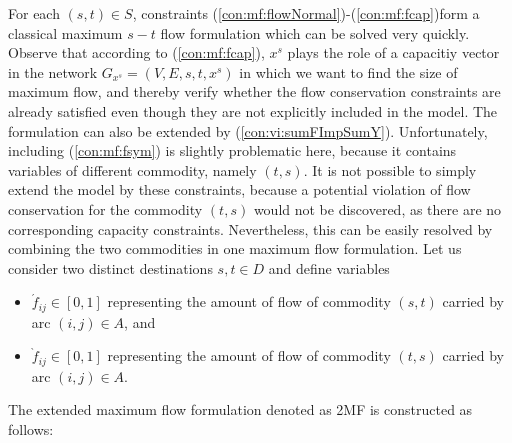 For each $(s,t)\in S$, constraints (\ref{con:mf:flowNormal})-(\ref{con:mf:fcap})form a classical maximum $s-t$ flow formulation which can be solved very quickly. Observe that according to (\ref{con:mf:fcap}), $x^s$ plays the role of a capacitiy vector in the network $G_{x^s}=(V,E,s,t,x^s)$ in which we want to find the size of maximum flow, and thereby verify whether the flow conservation constraints are already satisfied even though they are not explicitly included in the model. The formulation can also be extended by (\ref{con:vi:sumFImpSumY}). Unfortunately, including (\ref{con:mf:fsym}) is slightly problematic here, because it contains variables of different commodity, namely $(t,s)$. It is not possible to simply extend the model by these constraints, because a potential violation of flow conservation for the commodity $(t,s)$ would not be discovered, as there are no corresponding capacity constraints. Nevertheless, this can be easily resolved by combining the two commodities in one maximum flow formulation. Let us consider two distinct destinations $s,t\in D$ and define variables
\begin{itemize}
\item[] $\acute{f}_{ij}\in \left[0,1\right]$ representing the amount of flow of commodity $(s,t)$ carried by arc $(i,j)\in A$, and\newline
\item[] $\grave{f}_{ij}\in \left[0,1\right]$ representing the amount of flow of commodity $(t,s)$ carried by arc $(i,j)\in A$.
\end{itemize}
The extended maximum flow formulation denoted as 2MF is constructed as follows:
\newline
\newline  
